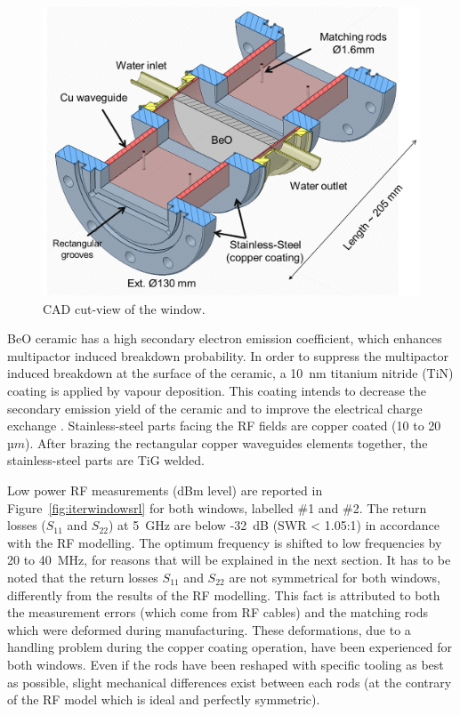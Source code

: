 {\begin{figure}
	\centering
	\includegraphics[width=1.0\linewidth]{figures/chap3/ITER_window/ITER_windows_geometry}
	\caption{CAD cut-view of the window.}
	\label{fig:iterwindowsgeometry}
\end{figure}

BeO ceramic has a high secondary electron emission coefficient, which enhances multipactor induced breakdown probability. In order to suppress the multipactor induced breakdown at the surface of the ceramic, a 10~\si{nm} titanium nitride (TiN) coating is applied by vapour deposition. This coating intends to decrease the secondary emission yield of the ceramic and to improve the electrical charge exchange  . Stainless-steel parts facing the RF fields are copper coated (10 to 20~$\si{µm}$).  After brazing the rectangular copper waveguides elements together, the stainless-steel parts are TiG welded. 

Low power RF measurements (dBm level) are reported in Figure~\ref{fig:iterwindowsrl} for both windows, labelled \#1 and \#2. The return losses ($S_{11}$ and $S_{22}$) at 5~GHz are below -32~dB (SWR < 1.05:1) in accordance with the RF modelling. The optimum frequency is shifted to low frequencies by 20 to 40~MHz, for reasons that will be explained in the next section. It has to be noted that the return losses $S_{11}$ and $S_{22}$ are not symmetrical for both windows, differently from the results of the RF modelling. This fact is attributed to both the measurement errors (which come from RF cables) and the matching rods which were deformed during manufacturing. These deformations, due to a handling problem during the copper coating operation, have been experienced for both windows. Even if the rods have been reshaped with specific tooling as best as possible, slight mechanical differences exist between each rods (at the contrary of the RF model which is ideal and perfectly symmetric). 

}
